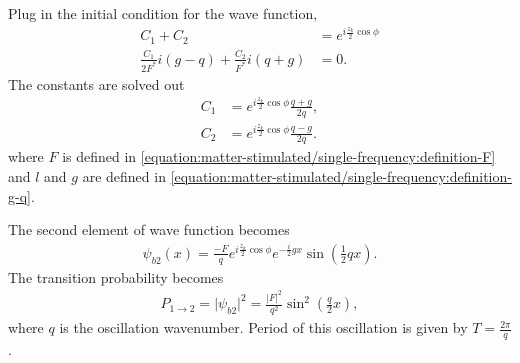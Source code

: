 \documentclass[letterpaper,12pt,english]{sphinxmanual}
\begin{document}
Plug in the initial condition for the wave function,
\begin{equation*}
\begin{split}C_1 + C_2 &= e^{i \frac{z_k}{2}\cos \phi} \\
\frac{C_1}{2F^ * } i \left( g - q \right) + \frac{C _ 2}{ F ^ *} i \left( q + g  \right) & = 0.\end{split}
\end{equation*}
The constants are solved out
\begin{equation*}
\begin{split}C_1 &= e^{i \frac{z_k}{2}\cos \phi} \frac{q + g }{2 q} , \\
C_2 &= e^{i \frac{z_k}{2}\cos \phi} \frac{ q - g }{2 q}.\end{split}
\end{equation*}
where \(F\) is defined in \eqref{equation:matter-stimulated/single-frequency:definition-F} and \(l\) and \(g\) are defined in \eqref{equation:matter-stimulated/single-frequency:definition-g-q}.

The second element of wave function becomes
\begin{equation*}
\begin{split}\psi_{b2}(x) = \frac{- F}{ q } e^{i\frac{z_k}{2} \cos\phi} e^{- \frac{i}{2}gx} \sin \left( \frac{1}{2} q x \right).\end{split}
\end{equation*}
The transition probability becomes
\begin{equation*}
\begin{split}P_{1\to 2} = \lvert \psi_{b2} \rvert^2 = \frac{\lvert F \rvert^2}{q^2} \sin^2\left( \frac{ q }{2} x \right),\end{split}
\end{equation*}
where \(q\) is the oscillation wavenumber. Period of this oscillation is given by \(T = \frac{2\pi}{q}\).
\end{document}

